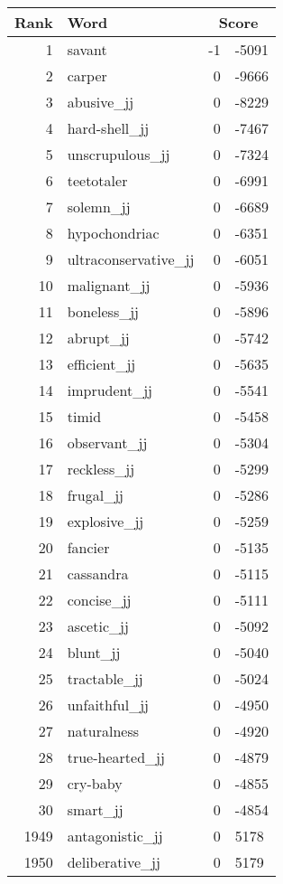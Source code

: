 \begin{longtable}[!htbp]{| rlr@{.}l |}
    \hline
    \textbf{Rank} & \textbf{Word} & \multicolumn{2}{c|}{\textbf{Score}} \\
    \hline
    \endhead
    1 & savant & -1 & -5091 \\
    2 & carper & 0 & -9666 \\
    3 & abusive\_jj & 0 & -8229 \\
    4 & hard-shell\_jj & 0 & -7467 \\
    5 & unscrupulous\_jj & 0 & -7324 \\
    6 & teetotaler & 0 & -6991 \\
    7 & solemn\_jj & 0 & -6689 \\
    8 & hypochondriac & 0 & -6351 \\
    9 & ultraconservative\_jj & 0 & -6051 \\
    10 & malignant\_jj & 0 & -5936 \\
    11 & boneless\_jj & 0 & -5896 \\
    12 & abrupt\_jj & 0 & -5742 \\
    13 & efficient\_jj & 0 & -5635 \\
    14 & imprudent\_jj & 0 & -5541 \\
    15 & timid & 0 & -5458 \\
    16 & observant\_jj & 0 & -5304 \\
    17 & reckless\_jj & 0 & -5299 \\
    18 & frugal\_jj & 0 & -5286 \\
    19 & explosive\_jj & 0 & -5259 \\
    20 & fancier & 0 & -5135 \\
    21 & cassandra & 0 & -5115 \\
    22 & concise\_jj & 0 & -5111 \\
    23 & ascetic\_jj & 0 & -5092 \\
    24 & blunt\_jj & 0 & -5040 \\
    25 & tractable\_jj & 0 & -5024 \\
    26 & unfaithful\_jj & 0 & -4950 \\
    27 & naturalness & 0 & -4920 \\
    28 & true-hearted\_jj & 0 & -4879 \\
    29 & cry-baby & 0 & -4855 \\
    30 & smart\_jj & 0 & -4854 \\
    1949 & antagonistic\_jj & 0 & 5178 \\
    1950 & deliberative\_jj & 0 & 5179 \\

\end{longtable}
